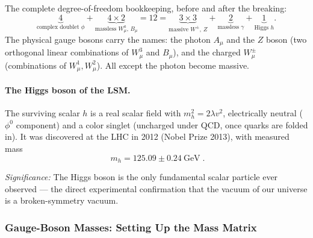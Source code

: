 The complete degree-of-freedom bookkeeping, before and after the breaking:
\begin{equation}
  \underbrace{4}_{\text{complex doublet }\phi}
  +\underbrace{4\times2}_{\text{massless }W^a_\mu,\,B_\mu}
  =12
  =\underbrace{3\times3}_{\text{massive }W^\pm,\,Z}
  +\underbrace{2}_{\text{massless }\gamma}
  +\underbrace{1}_{\text{Higgs }h} .
  \label{eq:lec17:dof_bookkeeping}
\end{equation}
The physical gauge bosons carry the names: the photon $A_\mu$ and the $Z$ boson (two orthogonal linear combinations of $W^3_\mu$ and $B_\mu$), and the charged $W^\pm_\mu$ (combinations of $W^1_\mu,W^2_\mu$). All except the photon become massive.

\paragraph{The Higgs boson of the LSM.}
The surviving scalar $h$ is a real scalar field with $m_h^2=2\lambda v^2$, electrically neutral ($\phi^0$ component) and a color singlet (uncharged under QCD, once quarks are folded in). It was discovered at the LHC in 2012 (Nobel Prize 2013), with measured mass
\begin{equation}
  \boxed{\;m_h=125.09\pm0.24\ \text{GeV}\;.}
  \label{eq:lec17:higgs_mass}
\end{equation}

\textit{Significance:} The Higgs boson is the only fundamental scalar particle ever observed --- the direct experimental confirmation that the vacuum of our universe is a broken-symmetry vacuum.

\subsubsection*{Gauge-Boson Masses: Setting Up the Mass Matrix}

